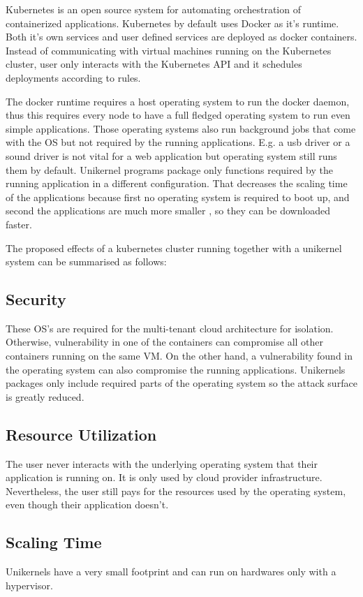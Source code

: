Kubernetes is an open source system for automating orchestration of containerized applications. \cite{Hightower:2017:KUR:3175917} Kubernetes by default uses Docker as it's runtime. Both it's own services and user defined services are deployed as docker containers. Instead of communicating with virtual machines running on the Kubernetes cluster, user only interacts with the Kubernetes API and it schedules deployments according to rules. 

The docker runtime requires a host operating system to run the docker daemon, thus this requires every node to have a full fledged operating system to run even simple applications. Those operating systems also run background jobs that come with the OS but not required by the running applications. E.g. a usb driver or a sound driver is not vital for a web application but operating system still runs them by default. Unikernel programs package only functions required by the running application in a different configuration. That decreases the scaling time\cite{Podolskiy:2017:QCA:3069383.3069390} of the applications because first no operating system is required to boot up, and second the applications are much more smaller , so they can be downloaded faster.

The proposed effects of a kubernetes cluster running together with a unikernel system can be summarised as follows: 

\subsection{Security}
 These OS's are required for the multi-tenant cloud architecture for isolation. Otherwise, vulnerability in one of the containers can compromise all other containers running on the same VM. On the other hand, a vulnerability found in the operating system can also compromise the running applications. Unikernels packages only include required parts of the operating system so the attack surface is greatly reduced.

\subsection{Resource Utilization}
The user never interacts with the underlying operating system that their application is running on. It is only used by cloud provider infrastructure. Nevertheless, the user still pays for the resources used by the operating system, even though their application doesn't. 

\subsection{Scaling Time}
Unikernels have a very small footprint and can run on hardwares only with a hypervisor.

